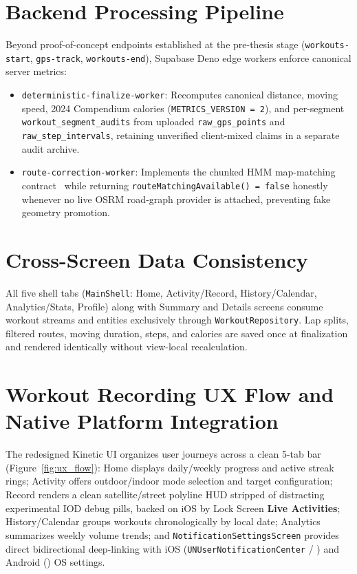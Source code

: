 \section{Backend Processing Pipeline}
Beyond proof-of-concept endpoints established at the pre-thesis stage (\texttt{workouts-start}, \texttt{gps-track}, \texttt{workouts-end}), Supabase Deno edge workers enforce canonical server metrics:
\begin{itemize}
    \item \texttt{deterministic-finalize-worker}: Recomputes canonical distance, moving speed, 2024 Compendium calories (\texttt{METRICS\_VERSION = 2}), and per-segment \texttt{workout\_segment\_audits} from uploaded \texttt{raw\_gps\_points} and \texttt{raw\_step\_intervals}, retaining unverified client-mixed claims in a separate audit archive.
    \item \texttt{route-correction-worker}: Implements the chunked HMM map-matching contract~\cite{newson2009hidden} while returning \texttt{routeMatchingAvailable() = false} honestly whenever no live OSRM road-graph provider is attached, preventing fake geometry promotion.
\end{itemize}

\section{Cross-Screen Data Consistency}
All five shell tabs (\texttt{MainShell}: Home, Activity/Record, History/Calendar, Analytics/Stats, Profile) along with Summary and Details screens consume workout streams and entities exclusively through \texttt{WorkoutRepository}. Lap splits, filtered routes, moving duration, steps, and calories are saved once at finalization and rendered identically without view-local recalculation.

\section{Workout Recording UX Flow and Native Platform Integration}
The redesigned Kinetic UI organizes user journeys across a clean 5-tab bar (Figure~\ref{fig:ux_flow}): Home displays daily/weekly progress and active streak rings; Activity offers outdoor/indoor mode selection and target configuration; Record renders a clean satellite/street polyline HUD stripped of distracting experimental IOD debug pills, backed on iOS by Lock Screen \textbf{Live Activities}; History/Calendar groups workouts chronologically by local date; Analytics summarizes weekly volume trends; and \texttt{NotificationSettingsScreen} provides direct bidirectional deep-linking with iOS (\texttt{UNUserNotificationCenter} / ) and Android () OS settings.

